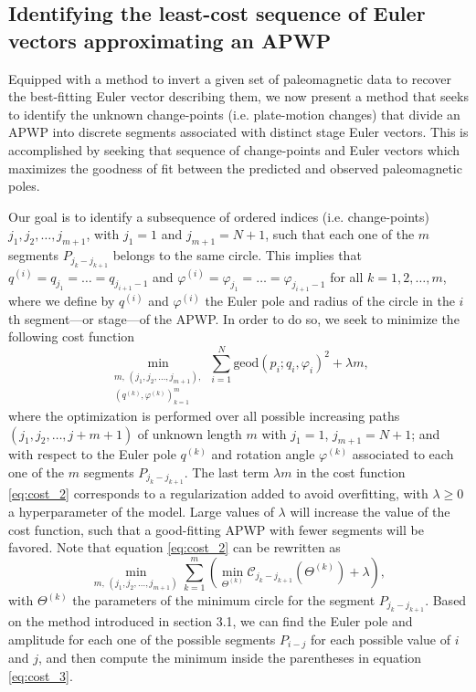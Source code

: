 \documentclass{article} %
\begin{document}
\subsection{Identifying the least-cost sequence of Euler vectors approximating an APWP}

Equipped with a method to invert a given set of paleomagnetic data to recover the best-fitting Euler vector describing them, we now present a  method that seeks to identify the unknown change-points (i.e. plate-motion changes) that divide an APWP into discrete segments associated with distinct stage Euler vectors. This is accomplished by seeking that sequence of change-points and Euler vectors which maximizes the goodness of fit between the predicted and observed paleomagnetic poles.

Our goal is to identify a subsequence of ordered indices (i.e. change-points) $j_1, j_2, \ldots, j_{m+1}$, with $j_1 = 1$ and $j_{m+1} = N+1$, such that each one of the $m$ segments $P_{j_k - j_{k+1}}$ belongs to the same circle. This implies that $q^{(i)} = q_{j_1} = \ldots = q_{j_{i+1}-1}$ and $\varphi^{(i)} = \varphi_{j_1} = \ldots = \varphi_{j_{i+1}-1}$ for all $k = 1, 2, \ldots, m$, where we define by $q^{(i)}$ and $\varphi^{(i)}$ the Euler pole and radius of the circle in the $i$th segment---or stage---of the APWP. In order to do so, we seek to minimize the following cost function 
\begin{equation}
    \min_{ \substack{ m, \, (j_1, j_2, \ldots, j_{m+1}), \\ (q^{(k)}, \varphi^{(k)})_{k=1}^m } } 
    \sum_{i=1}^N \text{geod}(p_i; q_i, \varphi_i)^2 + \lambda m,
    \label{eq:cost_2}
\end{equation}
where the optimization is performed over all possible increasing paths $(j_1, j_2, \ldots, j+m+1)$ of unknown length $m$ with $j_1=1$, $j_{m+1}=N+1$; and with respect to the Euler pole $q^{(k)}$ and rotation angle $\varphi^{(k)}$ associated to each one of the $m$ segments $P_{j_k-j_{k+1}}$.
The last term $\lambda m$ in the cost function \eqref{eq:cost_2} corresponds to a regularization added to avoid overfitting, with $\lambda \geq 0$ a hyperparameter of the model. Large values of $\lambda$ will increase the value of the cost function, such that a good-fitting APWP with fewer segments will be favored. Note that equation \eqref{eq:cost_2} can be rewritten as
\begin{equation}
    \min_{  m, \, (j_1, j_2, \ldots, j_{m+1}) } 
    \sum_{k=1}^m \left( \min_{\Theta^{(k)}}  \mathcal C_{j_k - j_{k+1}}(\Theta^{(k)}) + \lambda \right),
    \label{eq:cost_3}
\end{equation}
with $\Theta^{(k)}$ the parameters of the minimum circle for the segment $P_{j_k - j_{k+1}}$. Based on the method introduced in section 3.1, we can find the Euler pole and amplitude for each one of the possible segments $P_{i-j}$ for each possible value of $i$ and $j$, and then compute the minimum inside the parentheses in equation \eqref{eq:cost_3}.
\end{document}
